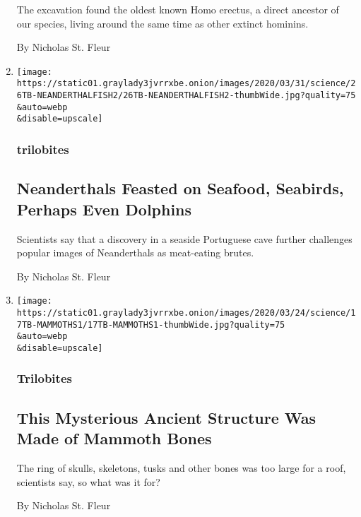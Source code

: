 \begin{enumerate}
  The excavation found the oldest known Homo erectus, a direct ancestor
  of our species, living around the same time as other extinct hominins.

  By Nicholas St. Fleur
\item
  \href{/2020/03/26/science/neanderthals-fishing-ocean.html}{}

  \texttt{[image: https://static01.graylady3jvrrxbe.onion/images/2020/03/31/science/26TB-NEANDERTHALFISH2/26TB-NEANDERTHALFISH2-thumbWide.jpg?quality=75\\\&auto=webp\\\&disable=upscale]}

  \hypertarget{trilobites-1}{%
  \subsubsection{trilobites}\label{trilobites-1}}

  \hypertarget{neanderthals-feasted-on-seafood-seabirds-perhaps-even-dolphins}{%
  \subsection{Neanderthals Feasted on Seafood, Seabirds, Perhaps Even
  Dolphins}\label{neanderthals-feasted-on-seafood-seabirds-perhaps-even-dolphins}}

  Scientists say that a discovery in a seaside Portuguese cave further
  challenges popular images of Neanderthals as meat-eating brutes.

  By Nicholas St. Fleur
\item
  \href{/2020/03/17/science/mammoth-bones-circle.html}{}

  \texttt{[image: https://static01.graylady3jvrrxbe.onion/images/2020/03/24/science/17TB-MAMMOTHS1/17TB-MAMMOTHS1-thumbWide.jpg?quality=75\\\&auto=webp\\\&disable=upscale]}

  \hypertarget{trilobites-2}{%
  \subsubsection{Trilobites}\label{trilobites-2}}

  \hypertarget{this-mysterious-ancient-structure-was-made-of-mammoth-bones}{%
  \subsection{This Mysterious Ancient Structure Was Made of Mammoth
  Bones}\label{this-mysterious-ancient-structure-was-made-of-mammoth-bones}}

  The ring of skulls, skeletons, tusks and other bones was too large for
  a roof, scientists say, so what was it for?

  By Nicholas St. Fleur
\end{enumerate}


